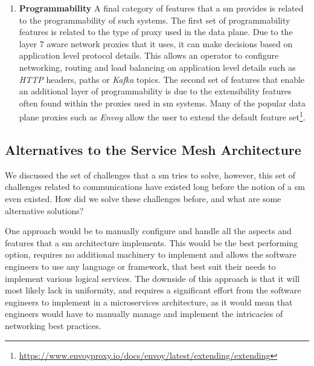 \begin{enumerate}[leftmargin=3\parindent]
    \item \textbf{Programmability}
    A final category of features that a \gls{sm} provides is related to the programmability of such systems. The first set of programmability features is related to the type of proxy used in the data plane. Due to the layer 7 aware network proxies that it uses, it can make decisions based on application level protocol details. This allows an operator to configure networking, routing and load balancing on application level details such as \textit{HTTP} headers, paths or \textit{Kafka} topics. The second set of features that enable an additional layer of programmability is due to the extensibility features often found within the proxies used in \gls{sm} systems. Many of the popular data plane proxies such as \textit{Envoy} allow the user to extend the default feature set\footnote{\url{https://www.envoyproxy.io/docs/envoy/latest/extending/extending}}.

\end{enumerate}


\subsection{Alternatives to the Service Mesh Architecture}
\label{sec:background:service-mesh:alternatives}

We discussed the set of challenges that a \gls{sm} tries to solve, however, this set of challenges related to communications have existed long before the notion of a \gls{sm} even existed. How did we solve these challenges before, and what are some alternative solutions? 

One approach would be to manually configure and handle all the aspects and features that a \gls{sm} architecture implements. This would be the best performing option, requires no additional machinery to implement and allows the software engineers to use any language or framework, that best suit their needs to implement various logical services. The downside of this approach is that it will most likely lack in uniformity, and requires a significant effort from the software engineers to implement in a microservices architecture, as it would mean that engineers would have to manually manage and implement the intricacies of networking best practices.

